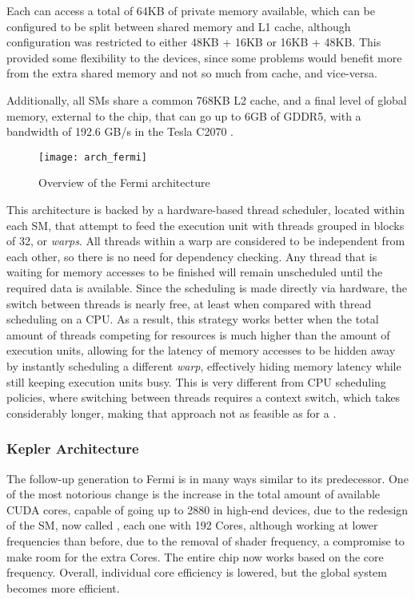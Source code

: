 \documentclass[main.tex]{subfiles}
\begin{document}
Each \sm can access a total of 64KB of private memory available, which can be configured to be split between shared memory and L1 cache, although configuration was restricted to either 48KB + 16KB or 16KB + 48KB. This provided some flexibility to the devices, since some problems would benefit more from the extra shared memory and not so much from cache, and vice-versa.

Additionally, all \acsp{SM} share a common 768KB L2 cache, and a final level of global memory, external to the chip, that can go up to 6GB of GDDR5, with a bandwidth of 192.6 GB/s in the Tesla C2070 \cite{NVIDIA:fermi}.

\begin{figure}[!htp]
  \centering
  \texttt{[image: arch\_fermi]}
  \caption{Overview of the Fermi architecture \label{fig:fermi}}
\end{figure}

This architecture is backed by a hardware-based thread scheduler, located within each \acs{SM}, that attempt to feed the execution unit with threads grouped in blocks of 32, or \textit{warps}. All threads within a warp are considered to be independent from each other, so there is no need for dependency checking. Any thread that is waiting for memory accesses to be finished will remain unscheduled until the required data is available. Since the scheduling is made directly via hardware, the switch between threads is nearly free, at least when compared with thread scheduling on a \acs{CPU}. As a result, this strategy works better when the total amount of threads competing for resources is much higher than the amount of execution units, allowing for the latency of memory accesses to be hidden away by instantly scheduling a different \textit{warp}, effectively hiding memory latency while still keeping execution units busy. This is very different from \acs{CPU} scheduling policies, where switching between threads requires a context switch, which takes considerably longer, making that approach not as feasible as for a \gpus.



\subsubsection{Kepler Architecture}

The follow-up generation to Fermi is in many ways similar to its predecessor. One of the most notorious change is the increase in the total amount of available CUDA cores, capable of going up to 2880 in high-end devices, due to the redesign of the \acl{SM}, now called \smx, each one with 192 \cuda Cores, although working at lower frequencies than before, due to the removal of shader frequency, a compromise to make room for the extra \cuda Cores. The entire chip now works based on the core frequency. Overall, individual core efficiency is lowered, but the global system becomes more efficient.
\end{document}
